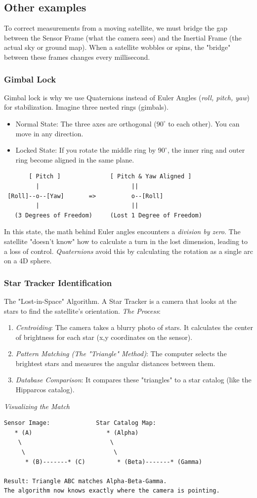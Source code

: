 \documentclass[a4paper,10pt]{article}
\begin{document}
\subsection{Other examples}
To correct measurements from a moving satellite, we must bridge the gap between the
Sensor Frame (what the camera sees) and the Inertial Frame (the actual sky or ground map). When a satellite wobbles or spins, the "bridge" between these frames changes every millisecond.
\subsubsection{Gimbal Lock}
Gimbal lock is why we use Quaternions instead of Euler Angles (\emph{roll, pitch, yaw}) for stabilization.
Imagine three nested rings (gimbals).\\
\begin{itemize}
\item Normal State: The three axes are orthogonal (\(90^{\circ}\) to each other). You can move in any direction.
\item Locked State: If you rotate the middle ring by \(90^{\circ}\), the inner ring and outer ring become aligned in the same plane.
\end{itemize}
\begin{verbatim}
       [ Pitch ]              [ Pitch & Yaw Aligned ]
         |                          ||
 [Roll]--o--[Yaw]       =>          o--[Roll]
         |                          ||
   (3 Degrees of Freedom)     (Lost 1 Degree of Freedom)
\end{verbatim}
In this state, the math behind Euler angles encounters a \emph{division by zero}. The satellite "doesn't know" how to calculate a turn in the lost dimension, leading to a loss of control. \emph{Quaternions} avoid this by calculating the rotation as a single arc on a 4D sphere.
\subsubsection{Star Tracker Identification}
The "Lost-in-Space" Algorithm. A Star Tracker is a camera that looks at the stars to find the satellite's orientation.
\emph{The Process}:
\begin{enumerate}
\item \emph{Centroiding}: The camera takes a blurry photo of stars. It calculates the center of brightness for each star (x,y coordinates on the sensor).
\item \emph{Pattern Matching (The "Triangle" Method)}: The computer selects the brightest stars and measures the angular distances between them.
\item \emph{Database Comparison}: It compares these "triangles" to a star catalog (like the Hipparcos catalog).
\end{enumerate}
\emph{Visualizing the Match}
\begin{verbatim}
Sensor Image:             Star Catalog Map:
   * (A)                     * (Alpha)
    \                         \
     \                         \
      * (B)-------* (C)         * (Beta)-------* (Gamma)

Result: Triangle ABC matches Alpha-Beta-Gamma.
The algorithm now knows exactly where the camera is pointing.
\end{verbatim}
\end{document}
